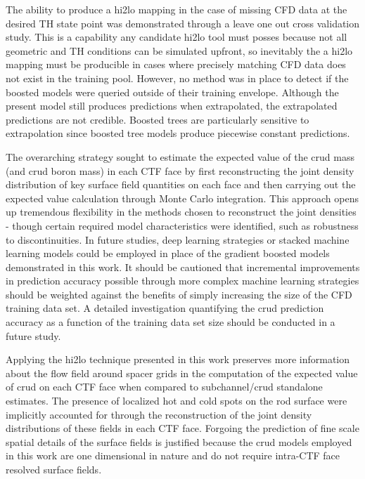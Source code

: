 The ability to produce a hi2lo mapping in the case of missing CFD data at the desired TH state point was demonstrated through a leave one out cross validation study.  This is a capability any candidate hi2lo tool must posses because not all geometric and TH conditions can be simulated upfront, so inevitably the a hi2lo mapping must be producible in cases where precisely matching CFD data does not exist in the training pool. However, no method was in place to detect if the boosted models were queried outside of their training envelope.  Although the present model still produces predictions when extrapolated, the extrapolated predictions are not credible.  Boosted trees are particularly sensitive to extrapolation since boosted tree models produce piecewise constant predictions.

The overarching strategy sought to estimate the expected value of the crud mass (and crud boron mass) in each CTF face by first reconstructing the joint density distribution of key surface field quantities on each face and then carrying out the expected value calculation through Monte Carlo integration.  This approach opens up tremendous flexibility in the methods chosen to reconstruct the joint densities - though certain required model characteristics were identified, such as robustness to discontinuities.  In future studies, deep learning strategies or stacked machine learning models could be employed in place of the gradient boosted models demonstrated in this work.  It should be cautioned that incremental improvements in prediction accuracy possible through more complex  machine learning strategies should be weighted against the benefits of simply increasing the size of the CFD training data set.  A detailed investigation quantifying the crud prediction accuracy as a function of the training data set size should be conducted in a future study.

Applying the hi2lo technique presented in this work preserves more information about the flow field around spacer grids in the computation of the expected value of crud on each CTF face when compared to subchannel/crud standalone estimates.  The presence of localized hot and cold spots on the rod surface were implicitly accounted for through the reconstruction of the joint density distributions of these fields in each CTF face.  Forgoing the prediction of fine scale spatial details of the surface fields is justified because the crud models employed in this work are one dimensional in nature and do not require intra-CTF face resolved surface fields.

